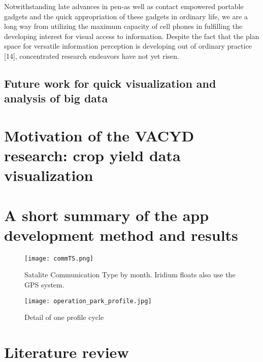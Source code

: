 Notwithstanding late advances in pen-as well as contact empowered portable gadgets and the quick appropriation of these gadgets in ordinary life, we are a long way from utilizing the maximum capacity of cell phones in fulfilling the developing interest for visual access to information. Despite the fact that the plan space for versatile  information perception is developing out of ordinary practice [14], concentrated research endeavors have not yet risen.





\subsection{Future work for quick visualization and analysis of big data}



\section{Motivation of the VACYD research: crop yield data visualization}



\section{A short summary of the app development method and results}



\begin{figure}[ht]
  \centering
  \begin{minipage}{4.5in}
    \texttt{[image: commTS.png]}
    \caption{ \label{fig:commTS} Satalite Communication Type by month. Iridium floats also use the GPS system.}
  \end{minipage}
\end{figure}

\begin{figure}[ht]
  \centering
  \begin{minipage}{4.5in}
    \texttt{[image: operation\_park\_profile.jpg]}
    \caption{ \label{fig:argo_cycle} Detail of one profile cycle\cite{argo}}
  \end{minipage}
\end{figure}

\section{Literature review}